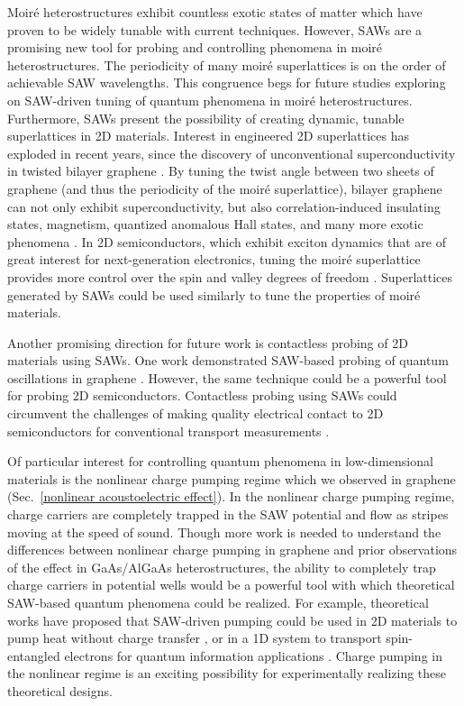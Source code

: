 \documentclass[double,12pt,1in,seploa]{beavtex}
\begin{document}
Moiré heterostructures exhibit countless exotic states of matter which have proven to be widely tunable with current techniques. However, SAWs are a promising new tool for probing and controlling phenomena in moiré heterostructures. The periodicity of many moiré superlattices is on the order of achievable SAW wavelengths. This congruence begs for future studies exploring on SAW-driven tuning of quantum phenomena in moiré heterostructures. Furthermore, SAWs present the possibility of creating dynamic, tunable superlattices in 2D materials. Interest in engineered 2D superlattices has exploded in recent years, since the discovery of unconventional superconductivity in twisted bilayer graphene \cite{cao_unconventional_2018}. By tuning the twist angle between two sheets of graphene (and thus the periodicity of the moiré superlattice), bilayer graphene can not only exhibit superconductivity, but also correlation-induced insulating states, magnetism, quantized anomalous Hall states, and many more exotic phenomena \cite{andrei_graphene_2020}. In 2D semiconductors, which exhibit exciton dynamics that are of great interest for next-generation electronics, tuning the moiré superlattice provides more control over the spin and valley degrees of freedom \cite{ciarrocchi_excitonic_2022}. Superlattices generated by SAWs could be used similarly to tune the properties of moiré materials. 

Another promising direction for future work is contactless probing of 2D materials using SAWs. One work demonstrated SAW-based probing of quantum oscillations in graphene \cite{fang_quantum_2023}. However, the same technique could be a powerful tool for probing 2D semiconductors. Contactless probing using SAWs could circumvent the challenges of making quality electrical contact to 2D semiconductors for conventional transport measurements \cite{miao_recent_2022}. 

Of particular interest for controlling quantum phenomena in low-dimensional materials is the nonlinear charge pumping regime which we observed in graphene (Sec.\ \ref{nonlinear acoustoelectric effect}). In the nonlinear charge pumping regime, charge carriers are completely trapped in the SAW potential and flow as stripes moving at the speed of sound. Though more work is needed to understand the differences between nonlinear charge pumping in graphene and prior observations of the effect in GaAs/AlGaAs heterostructures, the ability to completely trap charge carriers in potential wells would be a powerful tool with which theoretical SAW-based quantum phenomena could be realized. For example, theoretical works have proposed that SAW-driven pumping could be used in 2D materials to pump heat without charge transfer \cite{andreev_electronic_2022}, or in a 1D system to transport spin-entangled electrons for quantum information applications \cite{giavaras_quantum_2006}. Charge pumping in the nonlinear regime is an exciting possibility for experimentally realizing these theoretical designs.
\end{document}
